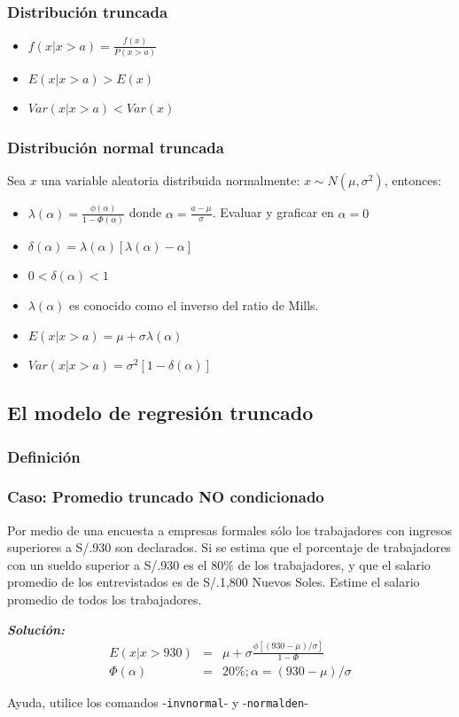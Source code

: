 \begin{frame}[fragile]
	\frametitle{Distribución truncada}
	\begin{itemize}
		\item $f(x|x>a)=\frac{f(x)}{P(x>a)}$
		\item $E(x|x>a)>E(x)$
		\item $Var(x|x>a)<Var(x)$
	\end{itemize}
\end{frame}

\begin{frame}[fragile]
	\frametitle{Distribución normal truncada}
	
	Sea $x$ una variable aleatoria distribuida normalmente: $x \sim
	N(\mu,\sigma^2)$, entonces:
	
	\begin{itemize}
		\item $\lambda(\alpha)=\frac{\phi(\alpha)}{1-\Phi(\alpha)}$ donde
		$\alpha=\frac{a-\mu}{\sigma}$. Evaluar y graficar en $\alpha=0$
		\item $\delta(\alpha)=\lambda(\alpha)[\lambda(\alpha)-\alpha]$
		\item $0<\delta(\alpha)<1$
		\item $\lambda(\alpha)$ es conocido como el inverso del ratio de Mills.
		\item $E(x|x>a)=\mu+\sigma\lambda(\alpha)$
		\item $Var(x|x>a)=\sigma^2[1-\delta(\alpha)]$
	\end{itemize}
\end{frame}

\subsection{El modelo de regresión truncado}

\subsubsection{Definición}

\begin{frame}[fragile]
	\frametitle{Caso: Promedio truncado NO condicionado}
	
	Por medio de una encuesta a empresas formales sólo los trabajadores con ingresos
	superiores a S/.930 son declarados. Si se estima que el
	porcentaje de trabajadores con un sueldo superior a S/.930 es el
	80$\%$ de los trabajadores, y que el salario promedio de los
	entrevistados es de S/.1,800 Nuevos Soles. Estime el salario promedio
	de todos los trabajadores. 
	\bigskip
	
	\emph{\textbf{Solución:}}
	\pause
	\begin{eqnarray}
		E(x|x>930) &=& \mu+\sigma\frac{\phi[(930-\mu)/\sigma]}{1-\Phi} \\
		\Phi(\alpha) &=& 20\%; \alpha=(930-\mu)/\sigma
	\end{eqnarray}
	
	Ayuda, utilice los comandos -\texttt{invnormal}- y -\texttt{normalden}-
\end{frame}

